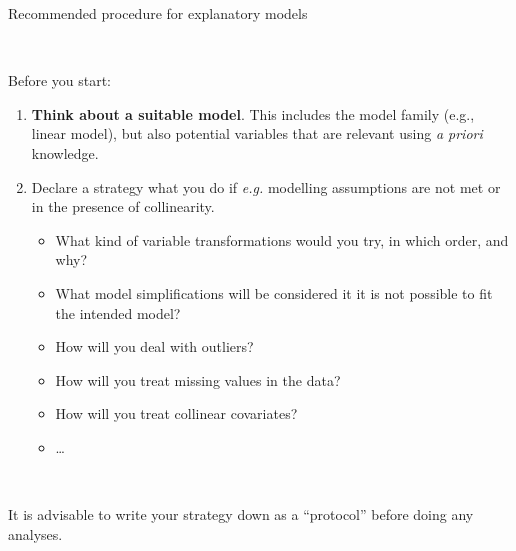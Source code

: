 \documentclass[10pt,ignorenonframetext,]{beamer}
\providecommand{\tightlist}{%
  \setlength{\itemsep}{0pt}\setlength{\parskip}{0pt}}
\begin{document}
\begin{frame}

\begin{block}{Recommended procedure for explanatory models}

\(~\)

Before you start: \vspace{2mm}

\begin{enumerate}
\item
  \textbf{Think about a suitable model}. This includes the model family
  (e.g., linear model), but also potential variables that are relevant
  using \emph{a priori} knowledge. \vspace{2mm}
\item
  Declare a strategy what you do if \emph{e.g.} modelling assumptions
  are not met or in the presence of collinearity.

  \begin{itemize}
  \tightlist
  \item
    What kind of variable transformations would you try, in which order,
    and why?
  \item
    What model simplifications will be considered it it is not possible
    to fit the intended model?
  \item
    How will you deal with outliers?
  \item
    How will you treat missing values in the data?
  \item
    How will you treat collinear covariates?
  \item
    \ldots{}
  \end{itemize}
\end{enumerate}

\(~\)

It is advisable to write your strategy down as a ``protocol'' before
doing any analyses.

\end{block}

\end{frame}
\end{document}
